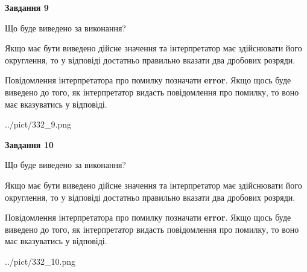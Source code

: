 \documentclass[12pt, ukrainian]{article}
\begin{document}
{\begin {Large}
{\begin {center}\textbf{Завдання 9}\end {center}}\par
Що буде виведено за виконання? \par

Якщо має бути виведено дійсне значення та інтерпретатор має здійснювати його округлення, 
то у відповіді достатньо правильно вказати два дробових розряди.

Повідомлення інтерпретатора про помилку позначати \textbf{error}.
Якщо щось буде виведено до того, як інтерпретатор видасть повідомлення про помилку, 
то воно має вказуватись у відповіді. \par

\begin{center}
	{../pict/332_9.png}
\end{center}
\newpage

{\begin {center}\textbf{Завдання 10}\end {center}}\par
Що буде виведено за виконання? \par

Якщо має бути виведено дійсне значення та інтерпретатор має здійснювати його округлення, 
то у відповіді достатньо правильно вказати два дробових розряди.

Повідомлення інтерпретатора про помилку позначати \textbf{error}.
Якщо щось буде виведено до того, як інтерпретатор видасть повідомлення про помилку, 
то воно має вказуватись у відповіді. \par

\begin{center}
	{../pict/332_10.png}
\end{center}
\newpage

\end {Large}}
\end{document}
